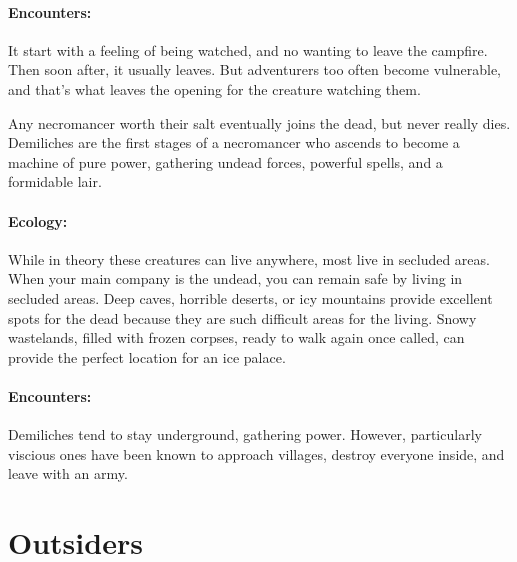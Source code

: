 \begin{multicols}{2}
\paragraph{Encounters:}  It start with a feeling of being watched, and no wanting to leave the campfire.  Then soon after, it usually leaves.  But adventurers too often become vulnerable, and that's what leaves the opening for the creature watching them.


\label{demilich}

Any necromancer worth their salt eventually joins the dead, but never really dies.  Demiliches are the first stages of a necromancer who ascends to become a machine of pure power, gathering undead forces, powerful spells, and a formidable lair.

\paragraph{Ecology:} While in theory these creatures can live anywhere, most live in secluded areas.  When your main company is the undead, you can remain safe by living in secluded areas.  Deep caves, horrible deserts, or icy mountains provide excellent spots for the dead because they are such difficult areas for the living.  Snowy wastelands, filled with frozen corpses, ready to walk again once called, can provide the perfect location for an ice palace.

\paragraph{Encounters:} Demiliches tend to stay underground, gathering power.  However, particularly viscious ones have been known to approach villages, destroy everyone inside, and leave with an army.

\demilich

\end{multicols}

\section{Outsiders}

